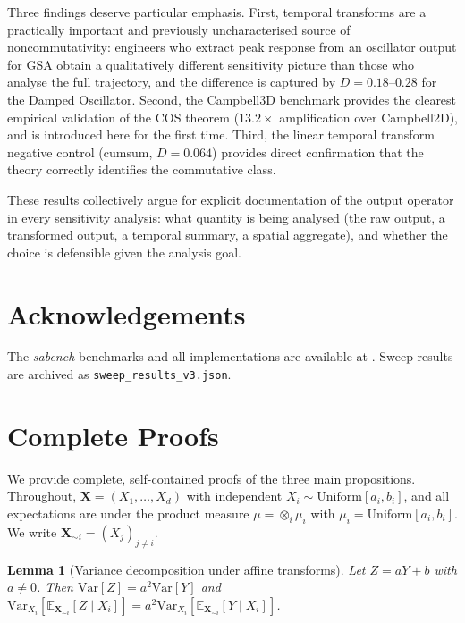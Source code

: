 \documentclass[11pt,onecolumn]{article}
\newtheorem{lemma}{Lemma}
\begin{document}
Three findings deserve particular emphasis. First, temporal transforms are a
practically important and previously uncharacterised source of noncommutativity:
engineers who extract peak response from an oscillator output for GSA obtain
a qualitatively different sensitivity picture than those who analyse the full
trajectory, and the difference is captured by $D = 0.18$--$0.28$ for the
Damped Oscillator. Second, the Campbell3D benchmark provides the clearest
empirical validation of the COS theorem ($13.2\times$ amplification over
Campbell2D), and is introduced here for the first time. Third, the linear
temporal transform negative control (cumsum, $D = 0.064$) provides direct
confirmation that the theory correctly identifies the commutative class.

These results collectively argue for explicit documentation of the output
operator in every sensitivity analysis: what quantity is being analysed
(the raw output, a transformed output, a temporal summary, a spatial aggregate),
and whether the choice is defensible given the analysis goal.

\section*{Acknowledgements}

The \textit{sabench} benchmarks and all implementations are available at
\citet{Hettinger2025}.  Sweep results are archived as \texttt{sweep\_results\_v3.json}.

\appendix
\section{Complete Proofs}
\label{app:proofs}

We provide complete, self-contained proofs of the three main propositions.
Throughout, $\mathbf{X} = (X_1, \ldots, X_d)$ with independent
$X_i \sim \mathrm{Uniform}[a_i, b_i]$, and all expectations are under the
product measure $\mu = \otimes_i \mu_i$ with $\mu_i = \mathrm{Uniform}[a_i,b_i]$.
We write $\mathbf{X}_{\sim i} = (X_j)_{j \neq i}$.

\begin{lemma}[Variance decomposition under affine transforms]
\label{lem:affine}
Let $Z = aY + b$ with $a \neq 0$.  Then
$\mathrm{Var}[Z] = a^2 \mathrm{Var}[Y]$ and
$\mathrm{Var}_{X_i}[\mathbb{E}_{\mathbf{X}_{\sim i}}[Z \mid X_i]]
= a^2 \mathrm{Var}_{X_i}[\mathbb{E}_{\mathbf{X}_{\sim i}}[Y \mid X_i]]$.
\end{lemma}
\end{document}
